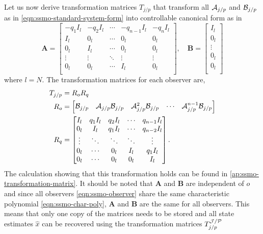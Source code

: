 Let us now derive transformation matrices $T_{j/p}$ that transform all $\mathcal{A}_{j/p}$ and $\mathcal{B}_{j/p}$ as in \eqref{eqn:ssmo-standard-system-form} into controllable canonical form as in \cite[Sec. 4.3.2]{Hespanha2018LinearTheory}
\begin{equation}\label{eqn:controllable-canonical-form}
    \mathbf{A} =
    \begin{bmatrix}
        -q_1I_l & -q_2I_l & \cdots & -q_{n-1}I_l & -q_nI_l \\
        I_l & 0_l & \cdots & 0_l & 0_l \\
        0_l & I_l & \cdots & 0_l & 0_l \\
        \vdots & \vdots & \ddots & \vdots & \vdots \\
        0_l & 0_l & \cdots & I_l & 0_l \\
    \end{bmatrix}, \quad
    \mathbf{B} = 
    \begin{bmatrix}
        I_l \\ 0_l \\ \vdots \\ 0_l \\ 0_l \\
    \end{bmatrix}
\end{equation}
where $l=N$. The transformation matrices for each observer are,
\begin{equation}\label{eqn:ssmo-transformation}
    \begin{split}
        T_{j/p} &= R_oR_q\\
        R_o &=
        \begin{bmatrix}
            \mathcal{B}_{j/p} & \mathcal{A}_{j/p}\mathcal{B}_{j/p} & \mathcal{A}^{2}_{j/p}\mathcal{B}_{j/p} & \cdots & \mathcal{A}^{n-1}_{j/p}\mathcal{B}_{j/p} \\
        \end{bmatrix} \\
        R_q &=
        \begin{bmatrix}
            I_l & q_1I_l & q_2I_l & \cdots & q_{n-1}I_l \\
            0_l & I_l & q_1I_l & \cdots & q_{n-2}I_l \\
            \vdots & \ddots & \ddots & \ddots & \vdots \\
            0_l & \cdots & 0_l & I_l & q_1I_l \\
            0_l & \cdots & 0_l & 0_l & I_l \\
        \end{bmatrix}.
    \end{split}
\end{equation}
The calculation showing that this transformation holds can be found in \autoref{ap:ssmo-transformation-matrix}. It should be noted that $\mathbf{A}$ and $\mathbf{B}$ are independent of $o$ and since all observers \eqref{eqn:ssmo-observer} share the same characteristic polynomial \eqref{eqn:ssmo-char-poly}, $\mathbf{A}$ and $\mathbf{B}$ are the same for all observers. This means that only one copy of the matrices needs to be stored and all state estimates $\hat{x}$ can be recovered using the transformation matrices $T^{\mathcal{J}/\mathcal{P}}_{j/p}$

